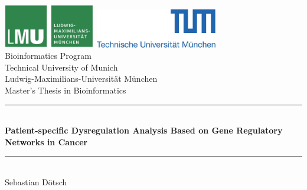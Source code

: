 \documentclass[pdftex,12pt,a4paper]{report}
\newcommand{\HRule}{\rule{\linewidth}{0.5mm}}
\begin{document}
\begin{titlepage}


\sffamily

\begin{center}


\includegraphics[width=0.3\textwidth]{bilder/logo2.jpg}
\hfill
\includegraphics[width=0.4\textwidth]{bilder/logo1.jpg}  
\\[5cm]

{\Large Bioinformatics Program}\\[0.5cm]
{\Large Technical University of Munich}\\[0.5cm]
{\Large Ludwig-Maximilians-Universit\"at M\"unchen}\\[2cm]
{\Large Master's Thesis in Bioinformatics}\\[1.5cm]

\HRule \\[0.4cm]
{ \huge \bfseries Patient-specific Dysregulation Analysis Based on Gene Regulatory Networks in Cancer}\\[0.4cm]

\HRule \\[1.5cm]

{\Large Sebastian Dötsch}\\[2.5cm]

\vfill
\end{center}
\end{titlepage}
\pagestyle{empty}
\end{document}
